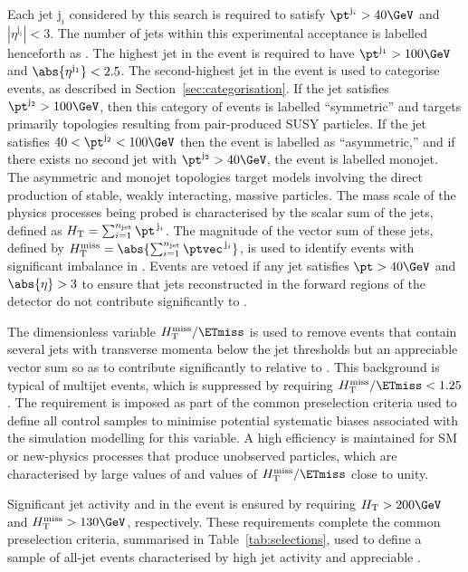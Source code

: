 Each jet $\mathrm{j}_i$ considered by this search is required to satisfy
$\pt^{\mathrm{j}_i} > 40\GeV$ and $|\eta^{\mathrm{j}_i}| < 3$. The number
of jets within this experimental acceptance is labelled henceforth as
\njet. The highest \pt jet in the event is required to have
$\pt^{\mathrm{j_1}} > 100\GeV$ and $\abs{\eta^{\mathrm{j_1}}} < 2.5$. The
second-highest \pt jet in the event is used to categorise events, as
described in Section~\ref{sec:categorisation}. If the jet satisfies
$\pt^{\mathrm{j_2}} > 100\GeV$, then this category of events is labelled
``symmetric'' and targets primarily topologies resulting from
pair-produced SUSY particles.
If the jet satisfies $40 < \pt^{\mathrm{j_2}} < 100\GeV$ then the event
is labelled as ``asymmetric,'' and if there exists no second jet with
$\pt^{\mathrm{j_2}} > 40\GeV$, the event is labelled monojet. The
asymmetric and monojet topologies target models involving the direct
production of stable, weakly interacting, massive particles.
The mass scale of the physics processes being probed is characterised
by the scalar \pt sum of the jets, defined as $\scalht =
\sum_{i=1}^{\njet} \pt^{\,\mathrm{j}_i}$.
The magnitude of the vector \ptvec sum of these jets, defined by
$\HTmiss = \abs{\sum_{{i}=1}^{\njet} \ptvec^{\,\mathrm{j}_i}}$, is
used to identify events with significant imbalance in
\ptvecmiss. Events are vetoed if any jet satisfies $\pt > 40\GeV$ and
$\abs{\eta} > 3$ to ensure that jets reconstructed in the forward regions
of the detector do not contribute significantly to \HTmiss.

The dimensionless variable $\HTmiss / \ETmiss$ is used to remove
events that contain several jets with transverse momenta below the jet
\pt thresholds but an appreciable vector \pt sum so as to contribute
significantly to \HTmiss relative to \ETmiss. This background is
typical of multijet events, which is suppressed by requiring $\HTmiss
/ \ETmiss < 1.25$. The requirement is imposed as part of the common
preselection criteria used to define all control samples to minimise
potential systematic biases associated with the simulation modelling
for this variable. A high efficiency is maintained for SM or
new-physics processes that produce unobserved particles, which are
characterised by large values of \ptvecmiss and values of $\HTmiss /
\ETmiss$ close to unity.

Significant jet activity and \ptvecmiss in the event is ensured by
requiring $\scalht > 200\GeV$ and $\HTmiss > 130\GeV$,
respectively. These requirements complete the common preselection
criteria, summarised in Table~\ref{tab:selections}, used to define a
sample of all-jet events characterised by high jet activity and
appreciable \ptvecmiss.

